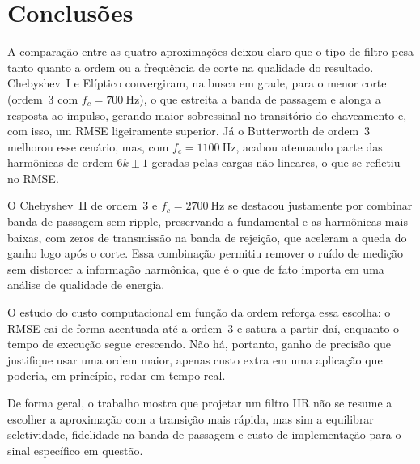 \section{Conclusões}

A comparação entre as quatro aproximações deixou claro que o tipo de filtro
pesa tanto quanto a ordem ou a frequência de corte na qualidade do
resultado. Chebyshev~I e Elíptico convergiram, na busca em grade, para o menor
corte (ordem~3 com $f_c = \SI{700}{\hertz}$), o que estreita a banda de passagem
e alonga a resposta ao impulso, gerando maior sobressinal no transitório do
chaveamento e, com isso, um RMSE ligeiramente superior. Já o Butterworth
de ordem~3 melhorou esse cenário, mas, com $f_c = \SI{1100}{\hertz}$, acabou
atenuando parte das harmônicas de ordem $6k\pm1$ geradas pelas cargas não
lineares, o que se refletiu no RMSE.

O Chebyshev~II de ordem~3 e $f_c = \SI{2700}{\hertz}$ se destacou justamente
por combinar banda de passagem sem ripple, preservando a fundamental e as
harmônicas mais baixas, com zeros de transmissão na banda de rejeição, que
aceleram a queda do ganho logo após o corte. Essa combinação permitiu
remover o ruído de medição sem distorcer a informação harmônica, que é o que
de fato importa em uma análise de qualidade de energia.

O estudo do custo computacional em função da ordem reforça essa escolha: o
RMSE cai de forma acentuada até a ordem~3 e satura a partir daí, enquanto o
tempo de execução segue crescendo. Não há, portanto, ganho de precisão que
justifique usar uma ordem maior, apenas custo extra em uma aplicação que
poderia, em princípio, rodar em tempo real.

De forma geral, o trabalho mostra que projetar um filtro IIR não se resume a
escolher a aproximação com a transição mais rápida, mas sim a equilibrar
seletividade, fidelidade na banda de passagem e custo de implementação para
o sinal específico em questão.
